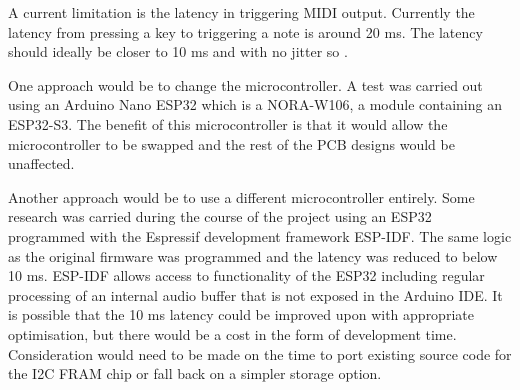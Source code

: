 

A current limitation is the latency in triggering MIDI output. Currently the latency from pressing a key to triggering a note is around 20 ms. 
The latency should ideally be closer to 10 ms and with no jitter so \cite{Jack2016}.

One approach would be to change the microcontroller. A test
was carried out using an Arduino Nano ESP32 which is a NORA-W106, a module containing an ESP32-S3. 
The benefit of this microcontroller is that it would allow the microcontroller to be swapped and the rest of the PCB
designs would be unaffected.

Another approach would be to use a different microcontroller entirely. 
Some research was carried during the course of the project using an ESP32 programmed with the Espressif development framework ESP-IDF. 
The same logic as the original firmware was programmed and the latency was reduced to below 10 ms. ESP-IDF allows access to functionality of the ESP32 including regular processing of an internal audio buffer that is not exposed in the Arduino IDE. 
It is possible that the 10 ms latency could be improved upon with appropriate optimisation, but there would be a cost in the form of development time. 
Consideration would need to be made on the time to port existing source code for the I2C FRAM chip or fall back on a simpler storage option.



